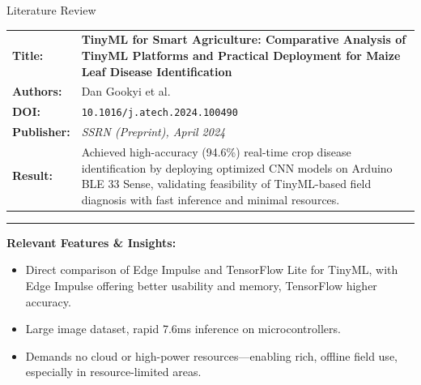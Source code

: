 \documentclass{beamer}
\begin{document}
\begin{frame} {Literature Review}

    \begin{tabularx} {\textwidth} {
            >{\bfseries}m{2.0cm}X
        }

        Title: & \textbf{TinyML for Smart Agriculture: Comparative Analysis of TinyML Platforms and Practical Deployment for Maize Leaf Disease Identification}
        \\

        Authors: & Dan Gookyi et al.
        \\

        DOI: & \texttt{10.1016/j.atech.2024.100490}

        \\

        Publisher: & \textit{SSRN (Preprint), April 2024} \vfill
        \\

        Result: &
        Achieved high-accuracy (94.6\%) real-time crop disease identification by deploying optimized
        CNN models on Arduino BLE 33 Sense, validating feasibility of TinyML-based field diagnosis
        with fast inference and minimal resources.

        \\

    \end{tabularx}

    {\color{leafColorSecondary} \rule{\textwidth}{0.75pt}}

    \textbf{Relevant Features \& Insights:}

    \begin{itemize}

        \item Direct comparison of Edge Impulse and TensorFlow Lite for TinyML, with Edge Impulse offering better usability and memory, TensorFlow higher accuracy.

        \item Large image dataset, rapid 7.6ms inference on microcontrollers.

        \item Demands no cloud or high-power resources—enabling rich, offline field use, especially in resource-limited areas.

    \end{itemize}

\end{frame}

%
%
%
%
%
%
\end{document}
